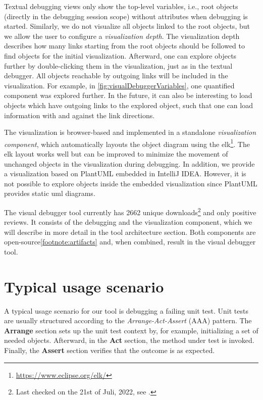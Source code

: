\documentclass[conference]{IEEEtran}
\newcommand{\intellij}{IntelliJ IDEA}
\begin{document}
Textual debugging views only show the top-level variables, i.e., root objects (directly in the debugging session scope) without attributes when debugging is started.
Similarly, we do not visualize all objects linked to the root objects, but we allow the user to configure a \textit{visualization depth}.
The visualization depth describes how many links starting from the root objects should be followed to find objects for the initial visualization.
Afterward, one can explore objects further by double-clicking them in the visualization, just as in the textual debugger.
All objects reachable by outgoing links will be included in the visualization.
For example, in \cref{fig:visualDebuggerVariables}, one quantified component was explored further.
In the future, it can also be interesting to load objects which have outgoing links to the explored object, such that one can load information with and against the link directions.

The visualization is browser-based and implemented in a standalone \textit{visualization component}, which automatically layouts the object diagram using the \gls*{elk}\footnote{\url{https://www.eclipse.org/elk/}}.
The \gls*{elk} layout works well but can be improved to minimize the movement of unchanged objects in the visualization during debugging.
In addition, we provide a visualization based on PlantUML embedded in \intellij{}.
However, it is not possible to explore objects inside the embedded visualization since PlantUML provides static \gls*{uml} diagrams.

The visual debugger tool currently has 2662 unique downloads\footnote{\label{footnote:pluginStats}Last checked on the 21st of Juli, 2022, see \cite{VisualDebuggerIntelliJ}.} and only positive reviews.
It consists of the debugging and the visualization component, which we will describe in more detail in the tool architecture section.
Both components are open-source\cref{footnote:artifacts} and, when combined, result in the visual debugger tool.

\section{Typical usage scenario}  \label{sec:usageScenario}
A typical usage scenario for our tool is debugging a failing unit test.
Unit tests are usually structured according to the \textit{Arrange-Act-Assert} (AAA) pattern.
The \textbf{Arrange} section sets up the unit test context by, for example, initializing a set of needed objects.
Afterward, in the \textbf{Act} section, the method under test is invoked.
Finally, the \textbf{Assert} section verifies that the outcome is as expected.
\end{document}

